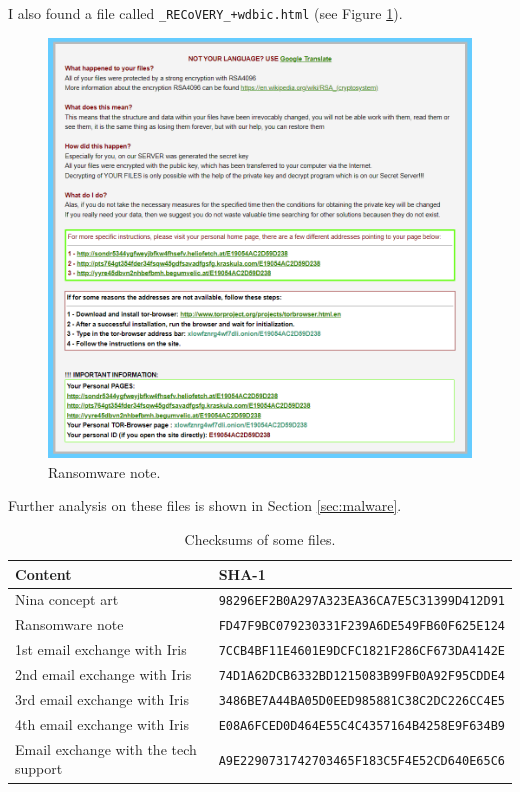 \documentclass[12pt]{article}
\begin{document}
I also found a file called \texttt{\_RECoVERY\_+wdbic.html} (see Figure \ref{fig:rec-file}).

\begin{figure}[!ht]
    \centering
    \includegraphics[width=\textwidth]{images/recovery_file.png}
    \caption{Ransomware note.}
    \label{fig:rec-file}
\end{figure}
Further analysis on these files is shown in Section \ref{sec:malware}.

\begin{table}[!ht]
    \centering
    \begin{tabular}{ll}
    \toprule
        \textbf{Content} & \textbf{SHA-1} \\
        \midrule
        Nina concept art & \texttt{98296EF2B0A297A323EA36CA7E5C31399D412D91} \\
        Ransomware note & \texttt{FD47F9BC079230331F239A6DE549FB60F625E124} \\
        1st email exchange with Iris & \texttt{7CCB4BF11E4601E9DCFC1821F286CF673DA4142E} \\
        2nd email exchange with Iris & \texttt{74D1A62DCB6332BD1215083B99FB0A92F95CDDE4} \\
        3rd email exchange with Iris & \texttt{3486BE7A44BA05D0EED985881C38C2DC226CC4E5} \\
        4th email exchange with Iris & \texttt{E08A6FCED0D464E55C4C4357164B4258E9F634B9} \\
        Email exchange with the tech support & \texttt{A9E2290731742703465F183C5F4E52CD640E65C6} \\
    \bottomrule
    \end{tabular}
    \caption{Checksums of some files.}
    \label{table:sha1}
\end{table}
\end{document}
